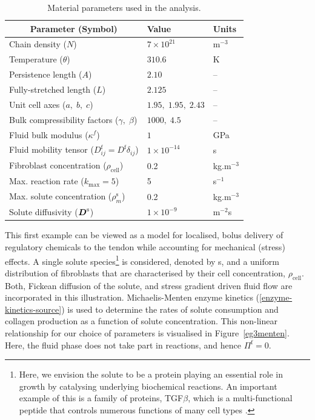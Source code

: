 \begin{table}
\centering
\begin{tabular}{lll}
\hline \multicolumn{1}{c}{Parameter (Symbol)} & Value & Units\\ \hline
Chain density ($N$) & $7\times 10^{21}$ &
$\mathrm{m}^{-3}$\\ Temperature ($\theta$) & $310.6$ & K\\ Persistence
length ($A$) & $2.10$ & --\\ Fully-stretched length ($L$) & $2.125$ &
--\\ Unit cell axes ($a,\;b,\;c$) & $1.95,\;1.95,\;2.43$ & --\\ Bulk
compressibility factors ($\gamma,\;\beta$) & $1000,\; 4.5$ &
--\\ Fluid bulk modulus ($\kappa^f$) & $1$ & GPa\\ Fluid mobility
tensor ($D^\mathrm{f}_{ij} = D^\mathrm{f}\delta_{ij}$) & $1\times
10^{-14}$ &s\\
Fibroblast concentration ($\rho_{\mathrm{cell}}$) & 0.2 &
kg.m$^{-3}$\\ Max. reaction rate ($k_{\mathrm{max}} = 5$) & 5 &
s$^{-1}$\\ Max. solute concentration ($\rho^{\mathrm{s}}_m$) & 0.2 &
kg.m$^{-3}$\\ Solute diffusivity ($\mbox{\boldmath$ D$}^\mathrm{s}$) & $1\times
10^{-9}$ & m$^{-2}$s\\ \hline
\end{tabular}
\caption{Material parameters used in the analysis.}
\label{parameters}
\end{table}

This first example can be viewed as a model for localised, bolus
delivery of regulatory chemicals to the tendon while accounting for
mechanical (stress) effects. A single solute species\footnote{Here, we
  envision the solute to be a protein playing an essential role in
  growth by catalysing underlying biochemical reactions. An important
  example of this is a family of proteins, TGF$\beta$, which is a
  multi-functional peptide that controls numerous functions of many
  cell types \citep{Alberts:02}.} is considered, denoted by s, and a
uniform distribution of fibroblasts that are characterised by their
cell concentration, $\rho_{\mathrm{cell}}$. Both, Fickean diffusion of
the solute, and stress gradient driven fluid flow are incorporated in
this illustration. Michaelis-Menten enzyme kinetics
(\ref{enzyme-kinetics-source}) is used to determine the rates of
solute consumption and collagen production as a function of solute
concentration. This non-linear relationship for our choice of
parameters is visualised in Figure~\ref{eg3menten}. Here, the fluid
phase does not take part in reactions, and hence $\Pi^\mathrm{f}=0$.

